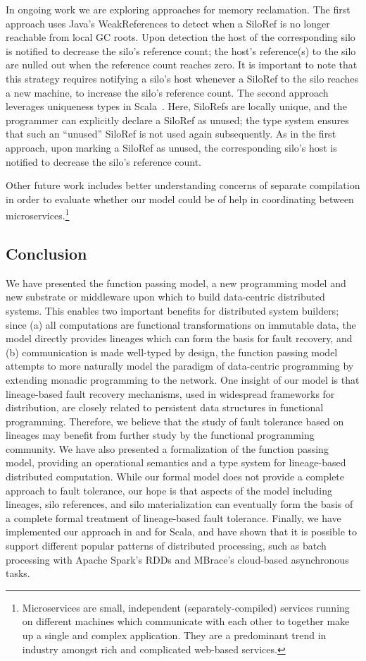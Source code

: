 \documentclass{jfp1}
\begin{document}
In ongoing work we are exploring approaches for memory reclamation. The first
approach uses Java's WeakReferences to detect when a SiloRef is no longer
reachable from local GC roots. Upon detection the host of the corresponding silo
is notified to decrease the silo's reference count; the host's reference(s) to
the silo are nulled out when the reference count reaches zero. It is important
to note that this strategy requires notifying a silo's host whenever a SiloRef
to the silo reaches a new machine, to increase the silo's reference count. The
second approach leverages uniqueness types in Scala~\cite{Uniqueness,HallerL16}. Here,
SiloRefs are locally unique, and the programmer can explicitly declare a SiloRef
as unused; the type system ensures that such an ``unused'' SiloRef is not used
again subsequently. As in the first approach, upon marking a SiloRef as unused,
the corresponding silo's host is notified to decrease the silo's reference
count.

Other future work includes better understanding concerns of separate compilation
in order to evaluate whether our model could be of help in coordinating between
microservices.\footnote{Microservices are small, independent
(separately-compiled) services running on different machines which communicate
with each other to together make up a single and complex application. They are a
predominant trend in industry amongst rich and complicated web-based services.}

\subsection{Conclusion}

We have presented the function passing model, a new programming model and new
substrate or middleware upon which to build data-centric distributed systems.
This enables two important benefits for distributed system builders; since (a)
all computations are functional transformations on immutable data, the model
directly provides lineages which can form the basis for fault recovery, and
(b) communication is made
well-typed by design, the function passing model attempts to more naturally
model the paradigm of data-centric programming by extending monadic programming
to the network. One insight of our model is that lineage-based fault recovery
mechanisms, used in widespread frameworks for distribution, are closely related
to persistent data structures in functional programming. Therefore, we believe
that the study of fault tolerance based on lineages may benefit from further
study by the functional programming community. We have also presented a
formalization of the function passing model, providing an operational
semantics and a type system for lineage-based distributed computation. While
our formal model does not provide a complete approach to fault tolerance,
our hope is that aspects of the model including lineages, silo references, and
silo materialization can eventually form the basis of a complete formal
treatment of lineage-based fault tolerance.
Finally, we have implemented our approach in and for Scala,
and have shown that it is possible to support different popular patterns of
distributed processing, such as  batch processing with Apache Spark's RDDs and
MBrace's cloud-based asynchronous tasks.
\end{document}
